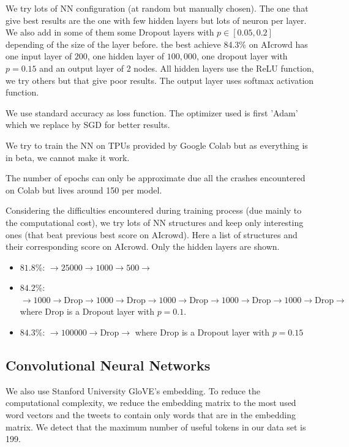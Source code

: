 \documentclass[11pt, a4paper, twocolumn]{article}
\begin{document}
We try lots of NN configuration (at random but manually chosen). The one that give best results are the one with 
few hidden layers but lots of neuron per layer. We also add in some of them some Dropout layers with $p\in [0.05, 0.2]$ 
depending of the size of the layer before.
the best achieve 84.3\% on AIcrowd has one input layer of $200$, one hidden layer of $100,000$, one dropout 
layer with $p=0.15$ and an output layer of 2 nodes. All hidden layers use the ReLU function, we try others 
but that give poor results. The output layer uses softmax activation function.

We use standard accuracy as loss function. The optimizer used is first 'Adam' which we replace by SGD for better results.

We try to train the NN on TPUs provided by Google Colab but as everything is in beta, we cannot make it work.

The number of epochs can only be approximate due all the crashes encountered on Colab but lives around 150 per model.

Considering the difficulties encountered during training process (due mainly to the computational cost), we try lots of NN 
structures and keep only interesting ones (that beat previous best score on AIcrowd). 
Here a list of structures and their corresponding score on AIcrowd. Only the hidden layers are shown.
\begin{itemize}
  \item \textbf{$81.8\%$}: $\rightarrow 25000\rightarrow 1000\rightarrow 500\rightarrow $
  \item \textbf{$84.2\%$}: $\rightarrow 1000\rightarrow \text{Drop}\rightarrow 1000
  \rightarrow \text{Drop}\rightarrow 1000\rightarrow \text{Drop}\rightarrow 1000
  \rightarrow \text{Drop}\rightarrow 1000\rightarrow \text{Drop}\rightarrow $ where Drop is a Dropout layer with $p=0.1$.
  \item \textbf{$84.3\%$}: $\rightarrow 100000\rightarrow \text{Drop}\rightarrow $ where Drop is a Dropout layer with $p=0.15$
\end{itemize}

\subsection{Convolutional Neural Networks}
We also use Stanford University GloVE's embedding\cite{glovepaper, gloveembedding}. To reduce the computational complexity, we reduce the embedding matrix to the most used word vectors and the tweets to contain only words that are in the embedding matrix. We detect that the maximum number of useful tokens in our data set is 199\label{199}.
\end{document}
